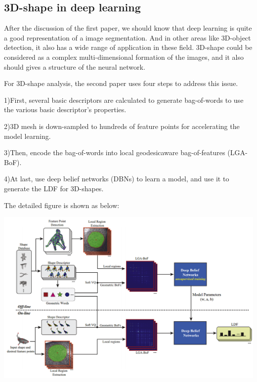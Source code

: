 \documentclass[pdftex,12pt,a4paper]{article}
\begin{document}
\subsection{3D-shape in deep learning}
After the discussion of the first paper, we should know that deep learning is quite a good representation of a image segmentation. And in other areas like 3D-object detection, it also has a wide range of application in these field. 3D-shape could be considered as a complex multi-dimensional formation of the images, and it also should gives a structure of the neural network.

For 3D-shape analysis, the second paper uses four steps to address this issue. 

1)First, several basic descriptors are calculated to generate bag-of-words to use the various basic descriptor's properties.

2)3D mesh is down-sampled to hundreds of feature points for accelerating the model learning. 

3)Then, encode the bag-of-words into local geodesicaware bag-of-features (LGA-BoF). 

4)At last, use deep belief networks (DBNs) to learn a model, and use it to generate the LDF for 3D-shapes.

The detailed figure is shown as below:

\begin{center}
\includegraphics[scale=0.3]{lit-rev3-p3.png}
\end{center}
\end{document}
